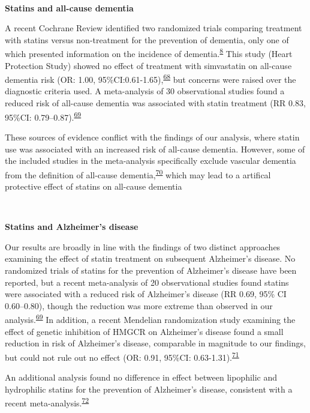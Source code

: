 \documentclass[a4paper, twoside]{templates/ociamthesis}
\begin{document}
~

\textbf{Statins and all-cause dementia}

A recent Cochrane Review identified two randomized trials comparing treatment with statins versus non-treatment for the prevention of dementia, only one of which presented information on the incidence of dementia.\textsuperscript{\protect\hyperlink{ref-mcguinness2016a}{8}} This study (Heart Protection Study) showed no effect of treatment with simvastatin on all-cause dementia risk (OR: 1.00, 95\%CI:0.61-1.65),\textsuperscript{\protect\hyperlink{ref-heartprotectionstudycollaborativegroup2002}{68}} but concerns were raised over the diagnostic criteria used. A meta-analysis of 30 observational studies found a reduced risk of all-cause dementia was associated with statin treatment (RR 0.83, 95\%CI: 0.79--0.87).\textsuperscript{\protect\hyperlink{ref-poly2020}{69}}

These sources of evidence conflict with the findings of our analysis, where statin use was associated with an increased risk of all-cause dementia. However, some of the included studies in the meta-analysis specifically exclude vascular dementia from the definition of all-cause dementia,\textsuperscript{\protect\hyperlink{ref-chao2015}{70}} which may lead to a artifical protective effect of statins on all-cause dementia

~

\textbf{Statins and Alzheimer's disease}

Our results are broadly in line with the findings of two distinct approaches examining the effect of statin treatment on subsequent Alzheimer's disease. No randomized trials of statins for the prevention of Alzheimer's disease have been reported, but a recent meta-analysis of 20 observational studies found statins were associated with a reduced risk of Alzheimer's disease (RR 0.69, 95\% CI 0.60--0.80), though the reduction was more extreme than observed in our analysis.\textsuperscript{\protect\hyperlink{ref-poly2020}{69}} In addition, a recent Mendelian randomization study examining the effect of genetic inhibition of HMGCR on Alzheimer's disease found a small reduction in risk of Alzheimer's disease, comparable in magnitude to our findings, but could not rule out no effect (OR: 0.91, 95\%CI: 0.63-1.31).\textsuperscript{\protect\hyperlink{ref-williams}{71}}

An additional analysis found no difference in effect between lipophilic and hydrophilic statins for the prevention of Alzheimer's disease, consistent with a recent meta-analysis.\textsuperscript{\protect\hyperlink{ref-chu2018}{72}}
\end{document}
